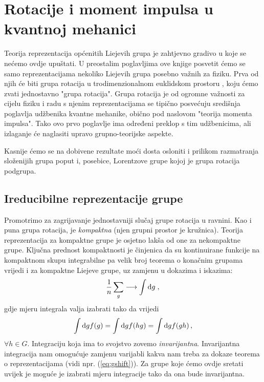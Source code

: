 
\chapter{Rotacije i moment impulsa u kvantnoj mehanici}
\label{ch:rotacije}

Teorija reprezentacija općenitih Liejevih grupa je zahtjevno
gradivo u koje se nećemo ovdje upuštati. U preostalim
poglavljima ove knjige posvetit ćemo se samo
reprezentacijama nekoliko Liejevih grupa posebno važnih
za fiziku. Prva od njih će biti grupa rotacija u trodimenzionalnom
euklidskom prostoru , koju ćemo  zvati
jednostavno "grupa rotacija". Grupa rotacija je od ogromne
važnosti za cijelu fiziku i radu s njenim reprezentacijama
se tipično posvećuju središnja poglavlja udžbenika kvantne mehanike,
obično pod naslovom "teorija momenta impulsa".
Tako ovo prvo poglavlje ima određeni preklop s tim udžbenicima, ali
izlaganje će naglasiti upravo grupno-teorijske aspekte.

Kasnije ćemo se na dobivene rezultate moći dosta osloniti i
prilikom razmatranja složenijih grupa poput  i, posebice,
Lorentzove grupe  kojoj je grupa rotacija podgrupa.

\section{Ireducibilne reprezentacije grupe }

Promotrimo za zagrijavanje jednostavniji slučaj grupe 
rotacija u ravnini. Kao i puna grupa rotacija,  je
\emph{kompaktna} (njen grupni prostor je kružnica).
Teorija reprezentacija za kompaktne grupe je osjetno lakša
 od one za nekompaktne grupe.
Ključna prednost kompaktnosti je činjenica da su kontinuirane funkcije
na kompaktnom skupu integrabilne pa 
velik broj teorema o konačnim grupama vrijedi i za kompaktne Liejeve
grupe, uz zamjenu u dokazima i iskazima:
\begin{equation}
    \frac{1}{n} \sum_{g} \longrightarrow \int \textrm{d} g \;,
\end{equation}
gdje mjeru integrala valja izabrati tako da vrijedi
\begin{equation}
  \int \textrm{d} g f(g) = \int \textrm{d} g f(hg) = \int \textrm{d} g f(gh) \,,
\end{equation}
$\forall h \in G$.
Integraciju koja ima to svojstvo zovemo \emph{invarijantna}.  
Invarijantna integracija nam omogućuje zamjenu
varijabli kakva nam treba za dokaze teorema o reprezentacijama
(vidi npr. (\ref{eq:gshift})).
Za grupe koje ćemo ovdje sretati uvijek je moguće je izabrati
mjeru integracije tako da ona bude invarijantna.


